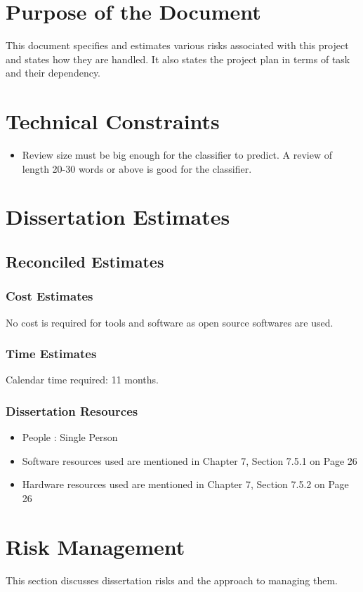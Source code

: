 \documentclass[oneside,a4paper,12pt]{pictreport}
\begin{document}
\section{Purpose of the Document}
This document specifies and estimates various risks
associated with this project and states how they are handled. 
It also states the project plan in terms of task and their dependency.

\section{Technical Constraints}
\begin{itemize}

\item Review size must be big enough for the classifier to predict.
A review of length 20-30 words or above is good for the classifier.
\end{itemize}

\section{Dissertation Estimates}
\subsection{Reconciled Estimates}
\subsubsection{Cost Estimates}
No cost is required for tools and software as open source softwares are used.
\subsubsection{Time Estimates}
Calendar time required: 11 months.
\subsubsection{Dissertation Resources}
\begin{itemize}
\item People : Single Person
\item Software resources used are mentioned in Chapter 7, Section 7.5.1 on Page 26
\item Hardware resources used are mentioned in Chapter 7, Section 7.5.2 on Page 26

\end{itemize}

\section{Risk Management}
This section discusses dissertation risks and the approach to managing them.
\end{document}
